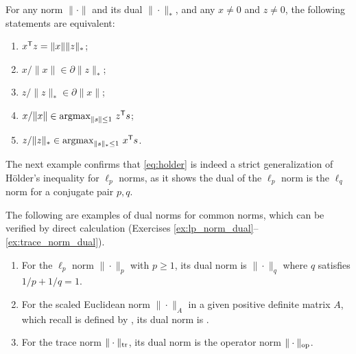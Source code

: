 \begin{Theorem}
\label{thm:dual_norm_subgradients}
For any norm $\|\cdot\|$ and its dual $\|\cdot\|_*$, and any $x \not= 0$ and $z 
\not= 0$, the following statements are equivalent:
\begin{enumerate}[label=(\roman*)]
\item $x^{\mathsf{T}} z = \|x\| \|z\|_*$;
\item $x/\|x\| \in \partial \|z\|_*$; 
\item $z/\|z\|_* \in \partial \|x\|$;
\item $x/\|x\| \in \operatorname*{argmax}_{\|s\| \leq 1} \, z^{\mathsf{T}} s$; 
\item $z/\|z\|_* \in \operatorname*{argmax}_{\|s\|_* \leq 1} \, x^{\mathsf{T}} s$. 
\end{enumerate}
\end{Theorem}

The next example confirms that \eqref{eq:holder} is indeed a strict
generalization of H{\"o}lder's inequality for $\ell_p$ norms, as it shows the
dual of the $\ell_p$ norm is the $\ell_q$ norm for a conjugate pair $p,q$.      

\begin{Example}
The following are examples of dual norms for common norms, which can be verified
by direct calculation (Exercises \ref{ex:lp_norm_dual}--\ref{ex:trace_norm_dual}). 

\begin{enumerate}[label=\alph*., ref=\alph*]
\item {} 
  For the $\ell_p$ norm $\|\cdot\|_p$ with $p \geq 1$, its dual norm is
  $\|\cdot\|_q$ where $q$ satisfies $1/p + 1/q = 1$.  

\item {}  
  For the scaled Euclidean norm $\|\cdot\|_A$ in a given positive definite
  matrix $A$, which recall is defined by ,
  its dual norm is .  

\item {}  
  For the trace norm $\|\cdot\|_{\operatorname{tr}}$, its dual norm is the operator norm
  $\|\cdot\|_{\mathrm{op}}$.   
\end{enumerate}
\end{Example}


